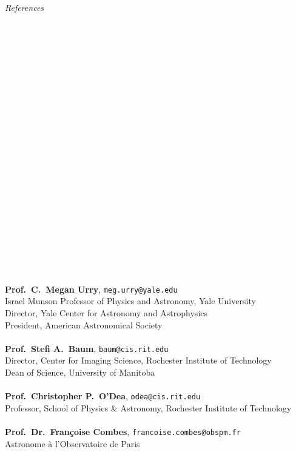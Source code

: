 \documentclass[11pt]{article}
\begin{document}
\vspace{4mm}



\hspace{2.5mm} \parbox{1.5in}{\textit{References \\\\\\\\\\\\\\\\\\\\\\\\\\\\\\\\\\\\\\\\\\\\\\}} \parbox{5.15in}{
\textbf{Prof.~C.~Megan Urry}, \texttt{meg.urry@yale.edu}\\
Israel Munson Professor of Physics and Astronomy, Yale University\\
Director, Yale Center for Astronomy and Astrophysics\\
President, American Astronomical Society\\ \\
\textbf{Prof.~Stefi A.~Baum}, \texttt{baum@cis.rit.edu}\\
Director, Center for Imaging Science, Rochester Institute of Technology\\
Dean of Science, University of Manitoba\\ \\
\textbf{Prof.~Christopher P.~O'Dea}, \texttt{odea@cis.rit.edu}\\
Professor, School of Physics \& Astronomy, Rochester Institute of Technology\\ \\
\textbf{Prof.~Dr.~Fran\c coise Combes}, \texttt{francoise.combes@obspm.fr}\\
Astronome \`a l'Observatoire de Paris\\ \\
}
\end{document}
